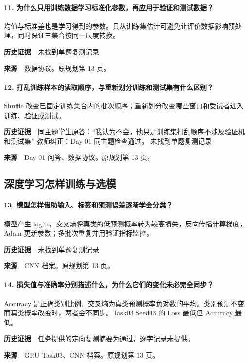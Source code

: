 \paragraph{11. 为什么只用训练数据学习标准化参数，再应用于验证和测试数据？}
均值与标准差也是学习得到的参数。只从训练集估计可避免让评价数据影响预处理，同时保证三集合按同一尺度转换。\par
\textbf{历史证据}　未找到单题复测记录\par
\textbf{来源}　数据协议。原规划第 13 页。\par
\paragraph{12. 打乱训练样本的读取顺序，与重新划分训练和测试集有什么区别？}
Shuffle 改变已固定训练集合内的批次顺序；重新划分改变哪些窗口和受试者进入训练、验证或测试。\par
\textbf{历史证据}　同主题学生原答：“我认为不会，他只是训练集打乱顺序不涉及验证机和测试集” 教师纠正：Day 01 同主题检查通过。 未找到单题复测记录\par
\textbf{来源}　Day 01 问答、数据协议。原规划第 13 页。\par
\clearpage\subsection{深度学习怎样训练与选模}
\paragraph{13. 模型怎样借助输入、标签和预测误差逐渐学会分类？}
模型产生 logits，交叉熵将真类的低预测概率转为较高损失，反向传播计算梯度，Adam 更新参数；多批次重复并用验证指标监控。\par
\textbf{历史证据}　未找到单题复测记录\par
\textbf{来源}　CNN 档案。原规划第 13 页。\par
\paragraph{14. 损失值与准确率分别描述什么，为什么它们的变化未必完全同步？}
Accuracy 是正确类别比例，交叉熵为真类预测概率负对数的平均。类别预测不变而真类概率改变时，两者会不同步。Task03 Seed43 的 Loss 最低但 Accuracy 最低。\par
\textbf{历史证据}　任务提供的定向复测摘要为通过，逐字记录未提供。\par
\textbf{来源}　GRU Task03、CNN 档案。原规划第 13 页。\par
